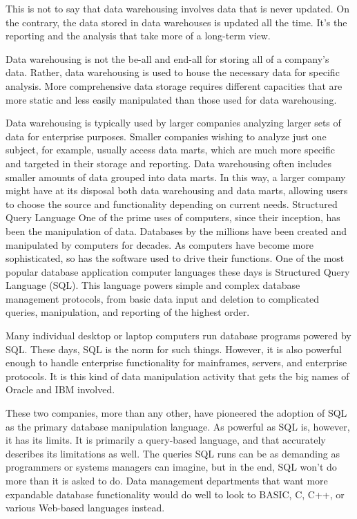 This is not to say that data warehousing involves data that is never updated. On the contrary, the data stored in data warehouses is updated all the time. It's the reporting and the analysis that take more of a long-term view.
 
Data warehousing is not the be-all and end-all for storing all of a company's data. Rather, data warehousing is used to house the necessary data for specific analysis. More comprehensive data storage requires different capacities that are more static and less easily manipulated than those used for data warehousing.
 
Data warehousing is typically used by larger companies analyzing larger sets of data for enterprise purposes. Smaller companies wishing to analyze just one subject, for example, usually access data marts, which are much more specific and targeted in their storage and reporting. Data warehousing often includes smaller amounts of data grouped into data marts. In this way, a larger company might have at its disposal both data warehousing and data marts, allowing users to choose the source and functionality depending on current needs.
Structured Query Language
One of the prime uses of computers, since their inception, has been the manipulation of data. Databases by the millions have been created and manipulated by computers for decades. As computers have become more sophisticated, so has the software used to drive their functions. One of the most popular database application computer languages these days is Structured Query Language (SQL). This language powers simple and complex database management protocols, from basic data input and deletion to complicated queries, manipulation, and reporting of the highest order.
 
Many individual desktop or laptop computers run database programs powered by SQL. These days, SQL is the norm for such things. However, it is also powerful enough to handle enterprise functionality for mainframes, servers, and enterprise protocols. It is this kind of data manipulation activity that gets the big names of Oracle and IBM involved.
 
These two companies, more than any other, have pioneered the adoption of SQL as the primary database manipulation language. As powerful as SQL is, however, it has its limits. It is primarily a query-based language, and that accurately describes its limitations as well. The queries SQL runs can be as demanding as programmers or systems managers can imagine, but in the end, SQL won't do more than it is asked to do. Data management departments that want more expandable database functionality would do well to look to BASIC, C, C++, or various Web-based languages instead.
 

